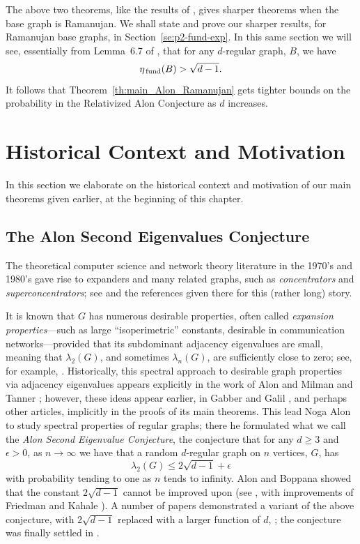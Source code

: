 \documentclass{memo-l}
\newcommand{\etafund}{{\eta_{\rm \,fund}}}
\theoremstyle{plain}
\theoremstyle{definition}
\numberwithin{section}{chapter}
\numberwithin{equation}{chapter}
\theoremstyle{plain}
\theoremstyle{definition}
\begin{document}
The above two theorems, like the results of \cite{lubetzky}, 
gives sharper theorems 
when the base graph is Ramanujan.
We shall state and prove our sharper results, for Ramanujan base graphs,
in Section~\ref{se:p2-fund-exp}.
In this same section we will see, essentially from
Lemma~6.7 of \cite{friedman_alon}, that for any $d$-regular graph, $B$,
we have
$$
\etafund(B) > \sqrt{d-1}.
$$
It follows that Theorem~\ref{th:main_Alon_Ramanujan} gets tighter
bounds on the probability in the Relativized Alon Conjecture
as $d$ increases.
\section{Historical Context and Motivation}
\label{se:p0-hist}

In this section we elaborate on
the historical context and motivation
of our main theorems given earlier, at the beginning of this chapter.

\subsection{The Alon Second Eigenvalues Conjecture}

The theoretical computer science and network theory literature
in the 1970's and 1980's gave rise to expanders and many related
graphs, such as {\em concentrators} and 
{\em superconcentrators}; 
see \cite{hoory_linial_wigderson,krebs_shaheen} and the references given 
there for this (rather long) story.

It is known that $G$ has numerous desirable properties, often called
{\it expansion properties}---such as large ``isoperimetric'' constants,
desirable in communication networks---provided that its subdominant
adjacency eigenvalues are small, meaning 
that $\lambda_2(G)$, and sometimes $\lambda_n(G)$, are
sufficiently close to zero;
see, for example, \cite{hoory_linial_wigderson,krebs_shaheen}.
Historically, this spectral approach to desirable graph properties
via adjacency eigenvalues appears explicitly in
the work of Alon and Milman \cite{alon_milman_FOCS,alon_milman}
and Tanner \cite{tanner}; however, these ideas appear earlier, 
in Gabber and Galil \cite{gabber_galil}, and perhaps
other articles, implicitly in the
proofs of its main theorems.
This lead Noga Alon 
\cite{alon_eigenvalues} to study spectral properties of regular graphs;
there he formulated what we call the {\em Alon Second Eigenvalue Conjecture},
the conjecture that for any $d\ge 3$
and
$\epsilon>0$, as $n\to\infty$ we have that a
random $d$-regular graph on $n$ vertices, $G$, has
\begin{equation}\label{eq:Alon_original}
\lambda_2(G)\le 2\sqrt{d-1}+\epsilon
\end{equation}
with probability tending to one as $n$ tends to infinity.
Alon and Boppana showed that the constant
$2\sqrt{d-1}$ cannot be improved upon (see \cite{alon_eigenvalues,
nilli}, with improvements of Friedman and Kahale 
\cite{friedman_geometric_aspects}).
A number of papers demonstrated a variant of the above conjecture,
with $2\sqrt{d-1}$ replaced 
with a larger function of $d$,
\cite{broder,friedman_kahn_szemeredi,friedman_random_graphs};
the conjecture was finally settled in
\cite{friedman_alon}.  
\end{document}

